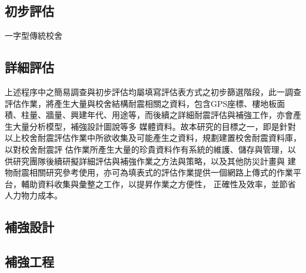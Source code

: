 \subsection{初步評估}



一字型傳統校舍

\subsection{詳細評估}

上述程序中之簡易調查與初步評估均屬填寫評估表方式之初步篩選階段，此一調查評估作業，將產生大量與校舍結構耐震相關之資料，包含GPS座標、樓地板面積、柱量、牆量、興建年代、用途等，而後續之詳細耐震評估與補強工作，亦會產生大量分析模型，補強設計圖說等多 媒體資料。故本研究的目標之一，即是針對以上校舍耐震評估作業中所欲收集及可能產生之資料，規劃建置校舍耐震資料庫，以對校舍耐震評 估作業所產生大量的珍貴資料作有系統的維護、儲存與管理，以供研究團隊後續研擬詳細評估與補強作業之方法與策略，以及其他防災計畫與 建物耐震相關研究參考使用，亦可為填表式的評估作業提供一個網路上傳式的作業平台，輔助資料收集與彙整之工作，以提昇作業之方便性， 正確性及效率，並節省人力物力成本。

\subsection{補強設計}

\subsection{補強工程}

